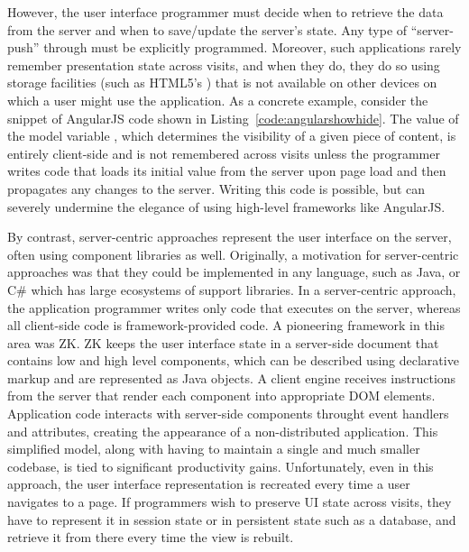 
However, the user interface programmer must decide when to retrieve the data
from the server and when to save/update the server's state.  Any type of ``server-push''
through must be explicitly programmed.  Moreover, such applications
rarely remember presentation state across visits, and when they do, they do so 
using storage facilities (such as HTML5's ) that is not 
available on other devices on which a user might use the application.
As a concrete example, consider the snippet of AngularJS code shown in
Listing~\ref{code:angularshowhide}. The value of the model variable ,
which determines the visibility of a given piece of content, is entirely
client-side and is not remembered across visits unless the programmer writes
code that loads its initial value from the server upon page load and then 
propagates any changes to the server.  Writing this code is possible, but can 
severely undermine the elegance of using high-level frameworks like AngularJS.

By contrast, server-centric approaches represent the user interface on
the server, often using component libraries as well.  Originally, a motivation
for server-centric approaches was that they could be implemented in any language,
such as Java, or C\# which has large ecosystems of support libraries.
In a server-centric approach, the application programmer writes only code
that executes on the server, whereas all client-side code is framework-provided
code.  A pioneering framework in this area was ZK\cite{chen2007zk}.
ZK keeps the user interface state in a server-side document that contains
low and high level components, which can be described using declarative
markup and are represented as Java objects.
A client engine receives instructions from the server that render each 
component into appropriate DOM elements.  Application code interacts
with server-side components throught event handlers and attributes, 
creating the appearance of a non-distributed application.  This simplified
model, along with having to maintain a single and much smaller codebase,
is tied to significant productivity gains.
Unfortunately, even in this approach, the user interface representation 
is recreated every time a user navigates to a page.  If programmers wish to
preserve UI state across visits, they have to represent it in session state
or in persistent state such as a database, and retrieve it from there every 
time the view is rebuilt.

